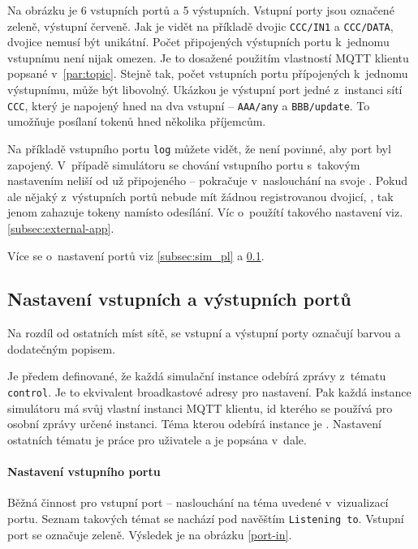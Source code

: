 Na obrázku je 6 vstupních portů a 5 výstupních. Vstupní porty jsou označené zeleně, výstupní červeně. Jak je vidět na příkladě dvojic \texttt{CCC/IN1} a \texttt{CCC/DATA}, dvojice nemusí být unikátní. Počet připojených výstupních portu k~jednomu vstupnímu není nijak omezen. Je to dosažené použitím vlastností MQTT klientu popsané v~\ref{par:topic}. Stejně tak, počet vstupních portu přípojených k~jednomu výstupnímu, může být libovolný. Ukázkou je výstupní port jedné z~instanci sítí \texttt{CCC}, který je napojený hned na dva vstupní -- \texttt{AAA/any} a \texttt{BBB/update}. To umožňuje posílaní tokenů hned několika příjemcům.

Na příkladě vstupního portu \texttt{log} můžete vidět, že není povinné, aby port byl zapojený. V~případě simulátoru se chování vstupního portu s~takovým nastavením  neliší od už připojeného -- pokračuje v~naslouchání na svoje . Pokud ale nějaký z~výstupních portů nebude mít žádnou registrovanou dvojicí, , tak jenom zahazuje tokeny namísto odesílání. Víc o~použítí takového nastavení viz. \ref{subsec:external-app}.

Více se o~nastavení portů viz \ref{subsec:sim_pl} a \ref{subsec:remote-ports-setup}.

\subsection{Nastavení vstupních a výstupních portů}
\label{subsec:remote-ports-setup}

Na rozdíl od ostatních míst sítě, se vstupní a výstupní porty označují barvou a dodatečným popisem.

Je předem definované, že každá simulační instance odebírá zprávy z~tématu \texttt{control}. Je to ekvivalent broadkastové adresy pro nastavení. Pak každá instance simulátoru má svůj vlastní instanci MQTT klientu, id kterého se používá pro osobní zprávy určené instanci. Téma kterou odebírá instance je . Nastavení ostatních tématu je práce pro uživatele a je popsána v~dale.

\paragraph{Nastavení vstupního portu}

Běžná činnost pro vstupní port -- naslouchání na téma uvedené v~vizualizací portu. Seznam takových témat se nachází pod navěštím \texttt{Listening to}. Vstupní port se označuje zeleně. Výsledek je na obrázku \ref{port-in}.

